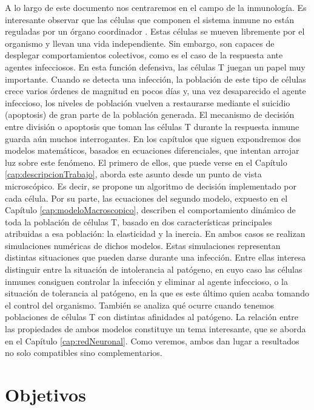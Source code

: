 A lo largo de este documento nos centraremos en el campo de la inmunología. Es interesante observar que las células que componen el sistema inmune no están reguladas por un órgano coordinador \citep{arias2016emergent}. Estas células se mueven libremente por el organismo y llevan una vida independiente. Sin embargo, son capaces de desplegar comportamientos colectivos, como es el caso de la respuesta ante agentes infecciosos. En esta función defensiva, las células T juegan un papel muy importante. Cuando se detecta una infección, la población de este tipo de células crece varios órdenes de magnitud en pocos días y, una vez desaparecido el agente infeccioso, los niveles de población vuelven a restaurarse mediante el suicidio (apoptosis) de gran parte de la población generada. El mecanismo de decisión entre división o apoptosis que toman las células T durante la respuesta inmune guarda aún muchos interrogantes. En los capítulos que siguen expondremos dos modelos matemáticos, basados en ecuaciones diferenciales, que intentan arrojar luz sobre este fenómeno. El primero de ellos, que puede verse en el Capítulo \ref{cap:descripcionTrabajo}, aborda este asunto desde un punto de vista microscópico. Es decir, se propone un algoritmo de decisión implementado por cada célula. Por su parte, las ecuaciones del segundo modelo, expuesto en el Capítulo \ref{cap:modeloMacroscopico}, describen el comportamiento dinámico de toda la población de células T, basado en dos características principales  atribuidas a esa población: la elasticidad y la inercia. En ambos casos se realizan simulaciones numéricas de dichos modelos. Estas simulaciones representan distintas situaciones que pueden darse durante una infección. Entre ellas interesa distinguir entre la situación de intolerancia al patógeno, en cuyo caso las células inmunes consiguen controlar la infección y eliminar al agente infeccioso, o la situación de tolerancia al patógeno, en la que es este último quien acaba tomando el control del organismo. También se analiza qué ocurre cuando tenemos poblaciones de células T con distintas afinidades al patógeno. La relación entre las propiedades de ambos modelos constituye un tema interesante, que se aborda en el Capítulo \ref{cap:redNeuronal}. Como veremos, ambos dan lugar a resultados no solo compatibles sino complementarios. 


\section{Objetivos}

